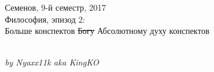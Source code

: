 

\begin{titlepage}
\par 
\vspace*{-2cm}
\begin{center}
{\sf \Large
\vspace*{1.5cm}
{\Huge Семенов, 9-й семестр, 2017}\\
{ Философия, эпизод 2:}\\
{ Больше конспектов \sout{Богу} Абсолютному духу конспектов}}\\

\vspace*{2cm}
 \\
{\small }
\begin{flushright}
\sl\small
by Nyaxx11k aka KingKO
\end{flushright}
\end{center}
\end{titlepage}
\topmargin -1cm 
\hoffset -0.7in 
\textwidth 6.0in 
\textheight 9.0in 
\normalsize 
{}
\tableofcontents
\pagebreak

